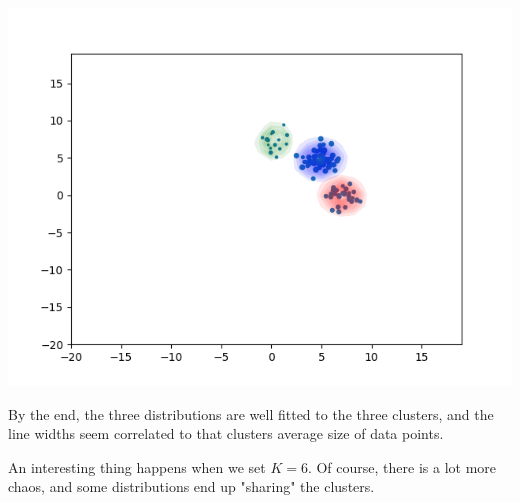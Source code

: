 \documentclass[11pt,a4paper]{article}
\begin{document}
\begin{center}
\includegraphics[width=\textwidth]{4_k=3.png}
\end{center}

By the end, the three distributions are well fitted to the three clusters, and the line widths seem correlated to that clusters average size of data points.

An interesting thing happens when we set $K=6$. Of course, there is a lot more chaos, and some distributions end up "sharing" the clusters.
\end{document}
